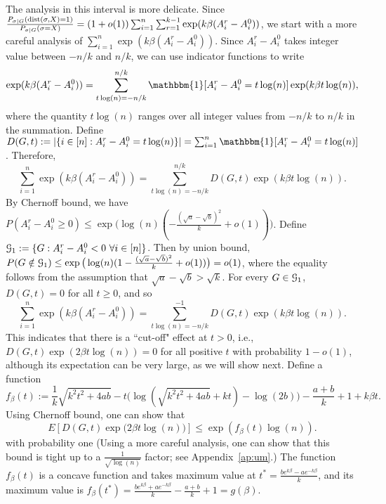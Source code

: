 \documentclass{article}
\begin{document}
The analysis in this interval is more delicate. Since $\frac{P_{\sigma|G} ( \operatorname{dist}(\sigma, X) = 1 )}{P_{\sigma|G}(\sigma= X)} 
= (1+o(1)) \sum_{i=1}^n \sum_{r=1}^{k-1}\exp (k\beta (A^r_i-A^0_i))$, we start with a more careful analysis of $\sum_{i=1}^n \exp (k \beta (A^r_i-A^0_i))$.
Since $A^r_i-A^0_i$ takes integer value between $-n/k$ and $n/k$,
we can use indicator functions to write
\begin{align*}
 \exp (k \beta (A^r_i-A^0_i))
=  \sum_{t\log(n)=-n/k}^{n/k}
\mathbbm{1}[A^r_i-A^0_i=t \log(n)] \exp (k\beta t \log(n) ) ,
\end{align*}
where the quantity $t\log(n)$ ranges over all integer values from $-n/k$ to $n/k$ in the summation.
Define $D(G,t):=|\{i\in[n]:A^r_i-A^0_i= t\log(n)\}|=\sum_{i=1}^n \mathbbm{1}[A^r_i-A^0_i=t \log(n)]$.
Therefore,
\begin{equation}  \label{eq:gour}
 \sum_{i=1}^n \exp (k \beta (A^r_i-A^0_i))
=  \sum_{t\log(n)=-n/k}^{n/k}
D(G,t) \exp (k\beta t \log(n) ) .
\end{equation}
By Chernoff bound, we have $P(A^r_i-A^0_i\ge 0)\le \exp\big(\log(n)(-\frac{(\sqrt{a}-\sqrt{b})^2}{k} +o(1)) \big)$.
Define $\mathcal{G}_1:=\{G:A^r_i-A^0_i< 0~\forall i\in[n]\}$. Then by union bound, $P(G\notin\mathcal{G}_1)\le\exp\big(\log(n)(1-\frac{(\sqrt{a}-\sqrt{b})^2}{k} +o(1)) \big) = o(1)$, where the equality follows from the assumption that $\sqrt{a}-\sqrt{b}>\sqrt{k}$.
For every $G\in\mathcal{G}_1$, $D(G,t)=0$ for all $t\ge 0$, and so
\begin{equation} \label{eq:duj}
 \sum_{i=1}^n \exp (k \beta (A^r_i-A^0_i))
=  \sum_{t\log(n)=-n/k}^{-1}
D(G,t) \exp (k\beta t \log(n) ) .
\end{equation}
This indicates that there is a ``cut-off" effect at $t>0$, i.e., $D(G,t) \exp (2\beta t \log(n) )=0$ for all positive $t$ with probability $1-o(1)$, although its expectation can be very large, as we will show next.
Define a function
$$
f_{\beta}(t):=\frac{1}{k}\sqrt{k^2t^2+4ab} -t\big(\log(\sqrt{k^2t^2+4ab}+kt)-\log(2b) \big) -\frac{a+b}{k} +1 +k\beta t.
$$
Using Chernoff bound, one can show that 
$$
E[D(G,t)
\exp\big(2\beta t \log(n) \big)]
\le \exp( f_{\beta}(t) \log(n) ) .
$$
with probability one (Using a more careful analysis, one can show that this bound is tight up to a $\frac{1}{\sqrt{\log(n)}}$ factor; see Appendix~\ref{ap:um}.)
The function $f_{\beta}(t)$ is a concave function and takes maximum value at $t^\ast=\frac{b e^{k\beta}-a e^{-k\beta}}{k}$, and its maximum value is $f_{\beta}(t^\ast)=\frac{b e^{k\beta}+a e^{-k\beta}}{k}-\frac{a+b}{k}+1
=g(\beta)$.
\end{document}
